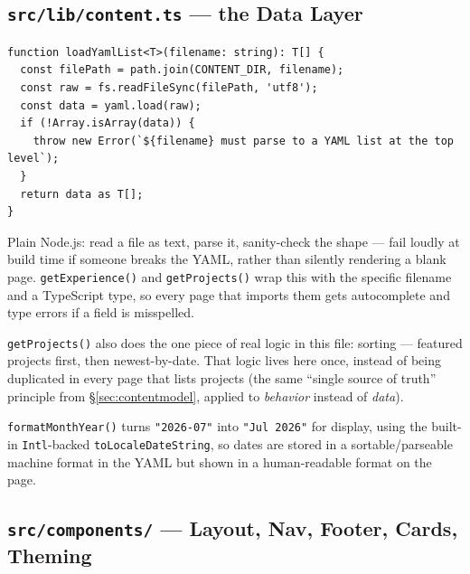 \documentclass[11pt]{article}
\begin{document}
\subsection{\texttt{src/lib/content.ts} --- the Data Layer}

\begin{lstlisting}
function loadYamlList<T>(filename: string): T[] {
  const filePath = path.join(CONTENT_DIR, filename);
  const raw = fs.readFileSync(filePath, 'utf8');
  const data = yaml.load(raw);
  if (!Array.isArray(data)) {
    throw new Error(`${filename} must parse to a YAML list at the top level`);
  }
  return data as T[];
}
\end{lstlisting}

Plain Node.js: read a file as text, parse it, sanity-check the shape ---
fail loudly at build time if someone breaks the YAML, rather than
silently rendering a blank page. \texttt{getExperience()} and
\texttt{getProjects()} wrap this with the specific filename and a
TypeScript type, so every page that imports them gets autocomplete and
type errors if a field is misspelled.

\texttt{getProjects()} also does the one piece of real logic in this
file: sorting --- featured projects first, then newest-by-date. That
logic lives here once, instead of being duplicated in every page that
lists projects (the same ``single source of truth'' principle from
\S\ref{sec:contentmodel}, applied to \emph{behavior} instead of
\emph{data}).

\texttt{formatMonthYear()} turns \texttt{"2026-07"} into \texttt{"Jul
2026"} for display, using the built-in \texttt{Intl}-backed
\texttt{toLocaleDateString}, so dates are stored in a
sortable/parseable machine format in the YAML but shown in a
human-readable format on the page.

\subsection{\texttt{src/components/} --- Layout, Nav, Footer, Cards, Theming}
\end{document}
